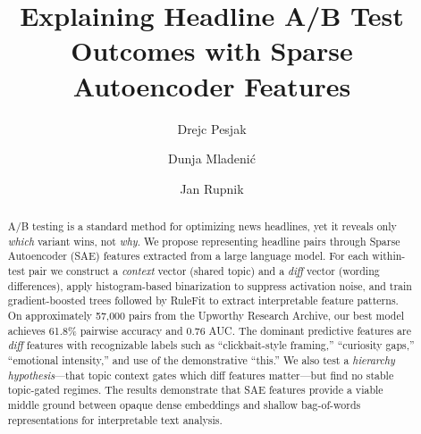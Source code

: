\documentclass[sigconf,natbib=false, language=english]{acmart}
\begin{document}
\title[SAE Features for Headline A/B Tests]{Explaining Headline A/B Test Outcomes with Sparse Autoencoder Features}

\author{Drejc Pesjak}

\author{Dunja Mladeni\'{c}}

\author{Jan Rupnik}

\renewcommand{\shortauthors}{D. Pesjak et al.}

\begin{abstract}
A/B testing is a standard method for optimizing news headlines, yet it reveals only \emph{which} variant wins, not \emph{why}. We propose representing headline pairs through Sparse Autoencoder (SAE) features extracted from a large language model. For each within-test pair we construct a \emph{context} vector (shared topic) and a \emph{diff} vector (wording differences), apply histogram-based binarization to suppress activation noise, and train gradient-boosted trees followed by RuleFit to extract interpretable feature patterns. On approximately 57,000 pairs from the Upworthy Research Archive, our best model achieves 61.8\% pairwise accuracy and 0.76 AUC. The dominant predictive features are \emph{diff} features with recognizable labels such as ``clickbait-style framing,'' ``curiosity gaps,'' ``emotional intensity,'' and use of the demonstrative ``this.'' We also test a \emph{hierarchy hypothesis}---that topic context gates which diff features matter---but find no stable topic-gated regimes. The results demonstrate that SAE features provide a viable middle ground between opaque dense embeddings and shallow bag-of-words representations for interpretable text analysis.
\end{abstract}


\maketitle
\end{document}
